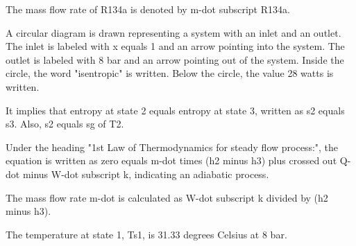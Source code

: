 The mass flow rate of R134a is denoted by m-dot subscript R134a.

A circular diagram is drawn representing a system with an inlet and an outlet. The inlet is labeled with x equals 1 and an arrow pointing into the system. The outlet is labeled with 8 bar and an arrow pointing out of the system. Inside the circle, the word "isentropic" is written. Below the circle, the value 28 watts is written.

It implies that entropy at state 2 equals entropy at state 3, written as s2 equals s3. Also, s2 equals sg of T2.

Under the heading "1st Law of Thermodynamics for steady flow process:", the equation is written as zero equals m-dot times (h2 minus h3) plus crossed out Q-dot minus W-dot subscript k, indicating an adiabatic process.

The mass flow rate m-dot is calculated as W-dot subscript k divided by (h2 minus h3).

The temperature at state 1, Ts1, is 31.33 degrees Celsius at 8 bar.